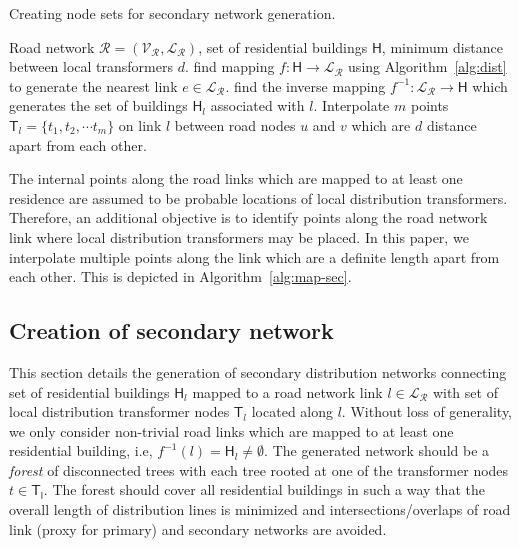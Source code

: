 \documentclass[sigconf]{acmart}
\begin{document}
\begin{algorithm}
	\caption{Creating node sets for secondary network generation.}
	\label{alg:map-sec}
	\begin{algorithmic}[1]
		\REQUIRE Road network $\mathcal{R=(\mathcal{V_R},\mathcal{L_R})}$, set of residential buildings $\mathsf{H}$, minimum distance between local transformers $d$.
		\STATE find mapping $f:\mathsf{H}\rightarrow\mathcal{L_R}$ using Algorithm~\ref{alg:dist} to generate the nearest link $e\in\mathcal{L_R}$.
		\ENDFOR
		\STATE find the inverse mapping $f^{-1}:\mathcal{L_R}\rightarrow\mathsf{H}$ which generates the set of buildings $\mathsf{H}_l$ associated with $l$.
		\STATE Interpolate $m$ points $\mathsf{T}_l=\{t_1,t_2,\cdots t_m\}$ on link $l$ between road nodes $u$ and $v$ which are $d$ distance apart from each other.
		\ENDFOR
	\end{algorithmic}
\end{algorithm}
The internal points along the road links which are mapped to at least one residence are assumed to be probable locations of local distribution transformers. Therefore, an additional objective is to identify points along the road network link where local distribution transformers may be placed. In this paper, we interpolate multiple points along the link which are a definite length apart from each other. This is depicted in Algorithm~\ref{alg:map-sec}.

\subsection{Creation of secondary network}\label{ssec:sec-network}
This section details the generation of secondary distribution networks connecting set of residential buildings $\mathsf{H}_l$ mapped to a road network link $l\in\mathcal{L_R}$ with set of local distribution transformer nodes $\mathsf{T}_l$ located along $l$. Without loss of generality, we only consider non-trivial road links which are mapped to at least one residential building, i.e, $f^{-1}(l)=\mathsf{H}_l\neq\emptyset$. The generated network should be a \emph{forest} of disconnected trees with each tree rooted at one of the transformer nodes $t\in\mathsf{T_l}$. The forest should cover all residential buildings in such a way that the overall length of distribution lines is minimized and intersections/overlaps of road link (proxy for primary) and secondary networks are avoided.
\end{document}
